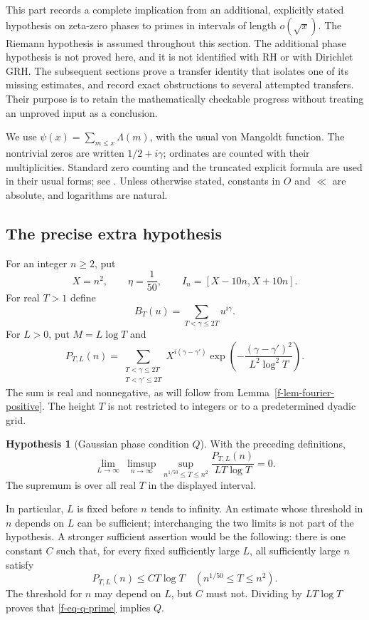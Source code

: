 \documentclass[11pt,a4paper]{article}
\theoremstyle{definition}
\newtheorem{hypothesis}[theorem]{Hypothesis}
\theoremstyle{remark}
\begin{document}
This part records a complete implication from an additional, explicitly
stated hypothesis on zeta-zero phases to primes in intervals of length
$o(\sqrt{x})$.  The Riemann hypothesis is assumed throughout this section.
The additional phase hypothesis is not proved here, and it is not identified
with RH or with Dirichlet GRH.  The subsequent sections prove a transfer
identity that isolates one of its missing estimates, and record exact
obstructions to several attempted transfers.  Their purpose is to retain
the mathematically checkable progress without treating an unproved input as
a conclusion.

We use $\psi(x)=\sum_{m\le x}\Lambda(m)$, with the usual von Mangoldt
function.  The nontrivial zeros are written $1/2+i\gamma$; ordinates are
counted with their multiplicities.  Standard zero counting and the truncated
explicit formula are used in their usual forms; see
\cite{f-titchmarsh}.  Unless otherwise stated, constants in $O$ and $\ll$
are absolute, and logarithms are natural.

\subsection{The precise extra hypothesis}
\label{f-sub-q-definition}

For an integer $n\ge2$, put
\[
 X=n^2,\qquad \eta=\frac1{50},\qquad
 I_n=[X-10n,X+10n].
\]
For real $T>1$ define
\[
 B_T(u)=\sum_{T<\gamma\le2T}u^{i\gamma}.
\]
For $L>0$, put $M=L\log T$ and
\begin{equation}
 P_{T,L}(n)=
 \sum_{\substack{T<\gamma\le2T\\T<\gamma'\le2T}}
 X^{i(\gamma-\gamma')}
 \exp\!\left(-\frac{(\gamma-\gamma')^2}{L^2\log^2T}\right).
 \label{f-eq-gaussian-energy}
\end{equation}
The sum is real and nonnegative, as will follow from
Lemma~\ref{f-lem-fourier-positive}.  The height $T$ is not restricted to
integers or to a predetermined dyadic grid.

\begin{hypothesis}[Gaussian phase condition $Q$]
\label{f-hyp-q}
With the preceding definitions,
\begin{equation}
 \lim_{L\to\infty}\ \limsup_{n\to\infty}\
 \sup_{n^{1/50}\le T\le n^2}
 \frac{P_{T,L}(n)}{LT\log T}=0.
 \label{f-eq-q}
\end{equation}
The supremum is over all real $T$ in the displayed interval.
\end{hypothesis}

In particular, $L$ is fixed before $n$ tends to infinity.  An estimate whose
threshold in $n$ depends on $L$ can be sufficient; interchanging the two
limits is not part of the hypothesis.  A stronger sufficient assertion
would be the following: there is one constant $C$ such that, for every
fixed sufficiently large $L$, all sufficiently large $n$ satisfy
\begin{equation}
 P_{T,L}(n)\le C T\log T
 \quad(n^{1/50}\le T\le n^2).
 \label{f-eq-q-prime}
\end{equation}
The threshold for $n$ may depend on $L$, but $C$ must not.  Dividing by
$LT\log T$ proves that \eqref{f-eq-q-prime} implies $Q$.
\end{document}
